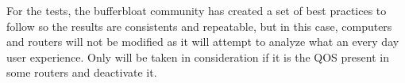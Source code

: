 For the tests, the bufferbloat community has created a set of best 
practices\cite{tg12} to follow so the results are consistents and repeatable, 
but in this case, computers and routers will not be modified as it will attempt 
to analyze what an every day user experience. Only will be taken in 
consideration if it is the QOS present in some routers and deactivate it.\\
 
